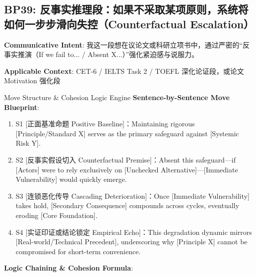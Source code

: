 \subsection{BP39: 反事实推理段：如果不采取某项原则，系统将如何一步步滑向失控（Counterfactual Escalation）}\label{sec:bp:BP39}
\noindent\textbf{\color{AcadNavy}Communicative Intent}: 我这一段想在议论文或科研立项书中，通过严密的“反事实推演（If we fail to... / Absent X...）”强化紧迫感与说服力。\par\vspace{2pt}
\noindent\textbf{\color{AcadSlate}Applicable Context}: CET-6 / IELTS Task 2 / TOEFL 深化论证段，或论文 Motivation 强化段\par\vspace{4pt}
\begin{ConceptBox}{Move Structure \& Cohesion Logic Engine}
\textbf{Sentence-by-Sentence Move Blueprint}:
\begin{enumerate}[label=\textbf{\color{AcadNavy}S\arabic*.}, leftmargin=2em, itemsep=2pt]
  \item S1 [正面基准命题 Positive Baseline]：Maintaining rigorous [Principle/Standard X] serves as the primary safeguard against [Systemic Risk Y].
  \item S2 [反事实假设切入 Counterfactual Premise]：Absent this safeguard---if [Actors] were to rely exclusively on [Unchecked Alternative]---[Immediate Vulnerability] would quickly emerge.
  \item S3 [连锁恶化传导 Cascading Deterioration]：Once [Immediate Vulnerability] takes hold, [Secondary Consequence] compounds across cycles, eventually eroding [Core Foundation].
  \item S4 [实证印证或结论锁定 Empirical Echo]：This degradation dynamic mirrors [Real-world/Technical Precedent], underscoring why [Principle X] cannot be compromised for short-term convenience.
\end{enumerate}\par\vspace{4pt}
\textbf{Logic Chaining \& Cohesion Formula}:\par{}
\end{ConceptBox}
